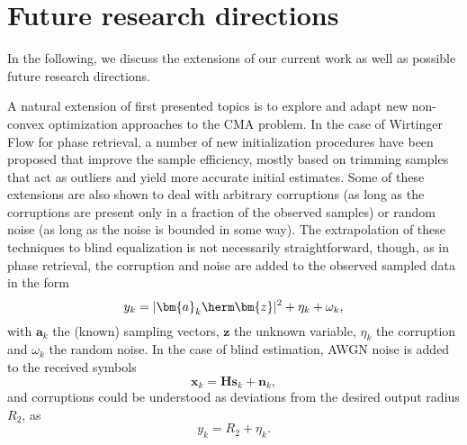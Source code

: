 \chapter{Future research directions}
\label{chap:future}

In the following, we discuss the extensions of our current work as well as possible
future research directions. 


A natural extension of first presented topics  is to explore and adapt new non-convex optimization approaches to the CMA problem. In the case of Wirtinger Flow for phase retrieval, a number of new initialization procedures have been proposed \cite{Candes2015a_phaseretrievalWF,Chen2015truncatedwf,Zhang2016mediantruncatedwf,Bostan2018AcceleratedWF} that improve the sample efficiency, mostly based on trimming samples that act as outliers and yield more accurate initial estimates. 
Some of these extensions are also shown to deal with arbitrary corruptions \cite{Zhang2016mediantruncatedwf} (as long as the corruptions are present only in a fraction of the observed samples) or random noise \cite{Cai2016thresholdedwf,Lazreg2018optimasparselrobustwf} (as long as the noise is bounded in some way). The extrapolation of these techniques to blind equalization is not necessarily straightforward, though, as in phase retrieval, the corruption and noise are added to the observed sampled data in the form 
\begin{equation}
y_k=|\bm{a}_k\herm\bm{z}|^2 + \eta_k+\omega_k,
\end{equation} 
with $\bm{a}_k$ the (known) sampling vectors, $\bm{z}$ the unknown variable, $\eta_k$ the corruption and $\omega_k$ the random noise. In the case of blind estimation, AWGN noise is added to the received symbols 
\begin{equation}
\bm{x}_k=\bm{H}\bm{s}_k+\bm{n}_k,
\end{equation}
and corruptions could be understood as deviations from the desired output radius $R_2$, as
\begin{equation}
y_k=R_2+\eta_k.
\end{equation} 

